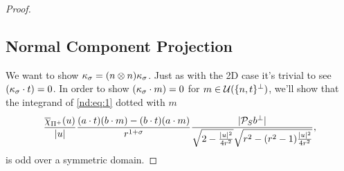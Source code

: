 \documentclass{article}
\newcommand{\optparens}[1]{\ifthenelse{\equal{#1}{}}{}{\parens{#1}}}
\newcommand{\U}[1]{\mathcal{U}\optparens{#1}}
\newcommand{\chit}[2]{\overline{\chi}_{#1}\optparens{#2}}
\newcommand{\ks}{\kappa_\sigma}
\newcommand{\Pu}{\Pi^+}
\newcommand{\Prs}{\mathcal{P}_S}
\newcommand{\Prsbp}{\Prs b^\perp}
\newcommand{\Prsbpa}{\abs{\Prsbp}}
\renewcommand{\dot}[2]{{#1}\cdot{#2}}
\newcommand{\pdot}[2]{\parens{\dot{#1}{#2}}}
\begin{document}
\begin{proof}
\subsection{Normal Component Projection} \label{nd:sect:norm}%
  We want to show $\ks = \parens{n \otimes n}\ks$. Just as with the 2D case it's trivial to see $\pdot{\ks}{t} = 0$. In order to show $\pdot{\ks}{m} = 0$ for $m \in \U{\braces{n,t}^\perp}$, we'll show that the integrand of \eqref{nd:eq:1} dotted with $m$
  \begin{equation}
    \frac{\chit{\Pu}{u}}{\abs{u}} \frac{\pdot{a}{t}\pdot{b}{m} - \pdot{b}{t}\pdot{a}{m}}{r^{1+\sigma}} \frac{\Prsbpa}{\sqrt{2 - \frac{\abs{u}^2}{4r^2}} \sqrt{r^2 - \parens{r^2-1} \frac{\abs{u}^2}{4r^2} }}, \label{nd:eq:normintegrand}
  \end{equation}
  is odd over a symmetric domain.


\end{proof}
\end{document}

